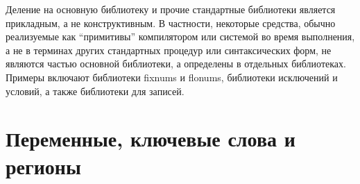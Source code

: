 Деление на основную библиотеку и прочие стандартные библиотеки является прикладным, а не
конструктивным. В частности, некоторые средства, обычно реализуемые как ``примитивы''
компилятором или системой во время выполнения, а не в терминах других стандартных процедур или
синтаксических форм, не являются частью основной библиотеки, а определены в отдельных
библиотеках. Примеры включают библиотеки fixnums и flonums, библиотеки исключений и условий, а
также библиотеки для записей.

\section{Переменные, ключевые слова и регионы}
\label{specialformsection}
\label{variablesection}

